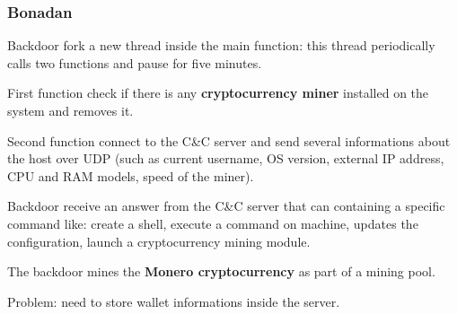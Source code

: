 \begin{frame}
	\frametitle{Bonadan}
	
	Backdoor fork a new thread inside the main function: this thread periodically calls two functions and pause for five minutes.
	
	\bigskip
	
	First function check if there is any \textbf{cryptocurrency miner} installed on the system and removes it.
	
	\bigskip
	
  Second function connect to the C\&C server and send several informations about the host over UDP (such as current username, OS version, external IP address, CPU and RAM models, speed of the miner).
  
	\bigskip
	
	Backdoor receive an answer from the C\&C server that can containing a specific command like: create a shell, execute a command on machine, updates the configuration, launch a cryptocurrency mining module.
	
	\bigskip
	
  The backdoor mines the \textbf{Monero cryptocurrency} as part of a mining pool.

	\bigskip
	
  Problem: need to store wallet informations inside the server.
  
\end{frame}
	


